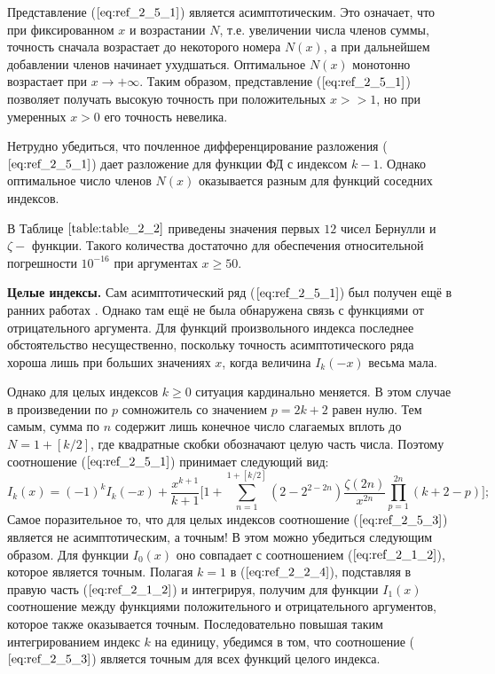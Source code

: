 Представление ($\ref{eq:ref_2_5_1}$) является асимптотическим. Это означает, что при
фиксированном $x$ и возрастании $N$, т.е. увеличении числа членов суммы,
точность сначала возрастает до некоторого номера $N(x)$, а при дальнейшем
добавлении членов начинает ухудшаться. Оптимальное $N(x)$ монотонно
возрастает при $x \to +\infty$. Таким образом, представление ($\ref{eq:ref_2_5_1}$) позволяет получать
высокую точность при положительных $x >> 1$, но при умеренных $x > 0$ его
точность невелика.

Нетрудно убедиться, что почленное дифференцирование разложения ($\ref{eq:ref_2_5_1}$)
дает разложение для функции ФД с индексом $k - 1$. Однако оптимальное
число членов $N(x)$ оказывается разным для функций соседних индексов.

В Таблице $\ref{table:table_2_2}$ приведены значения первых $12$ чисел Бернулли и
$\zeta -$ функции. Такого количества достаточно для обеспечения относительной
погрешности $10^{-16}$ при аргументах $x \geqslant 50$.



\textbf{Целые индексы.} Сам асимптотический ряд ($\ref{eq:ref_2_5_1}$) был получен ещё в ранних
работах \cite{Stoner}. Однако там ещё не была обнаружена связь с функциями от
отрицательного аргумента. Для функций произвольного индекса последнее
обстоятельство несущественно, поскольку точность асимптотического ряда
хороша лишь при больших значениях $x$, когда величина $I_k(-x)$ весьма мала.

Однако для целых индексов $k \geqslant 0$ ситуация кардинально меняется. В этом
случае в произведении по $p$ сомножитель со значением \linebreak $p = 2k + 2$ равен нулю.
Тем самым, сумма по $n$ содержит лишь конечное число слагаемых вплоть до
$N=1+[k/2]$, где квадратные скобки обозначают целую часть числа. Поэтому
соотношение ($\ref{eq:ref_2_5_1}$) принимает следующий вид:
\begin{equation}
I_k(x) = (-1)^k I_k(-x)+ \frac{x^{k+1}}{k+1}\Bigg[ 1+\sum\limits_{n=1}^{1+[k/2]} (2-2^{2-2n}) \frac{\zeta (2n)}{x^{2n}}  \prod\limits_{p=1}^{2n} (k+2-p) \Bigg];
\label{eq:ref_2_5_3}
\end{equation}
Самое поразительное то, что для целых индексов соотношение ($\ref{eq:ref_2_5_3}$) является не
асимптотическим, а точным! В этом можно убедиться следующим образом. Для
функции $I_0(x)$ оно совпадает с соотношением ($\ref{eq:ref_2_1_2}$), которое является точным.
Полагая $k=1$ в ($\ref{eq:ref_2_2_4}$), подставляя в правую часть ($\ref{eq:ref_2_1_2}$) и интегрируя,
получим для функции $I_1(x)$ соотношение между функциями положительного и
отрицательного аргументов, которое также оказывается точным.
Последовательно повышая таким интегрированием индекс $k$ на единицу,
убедимся в том, что соотношение ($\ref{eq:ref_2_5_3}$) является точным для всех функций
целого индекса.

